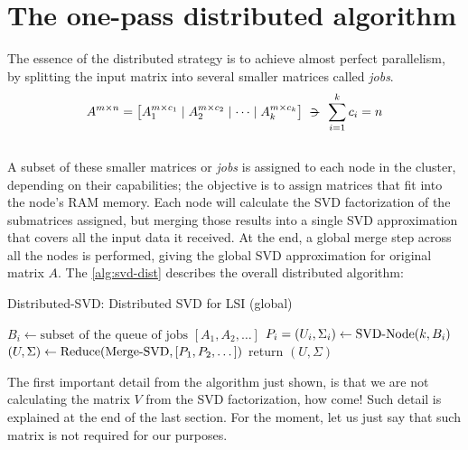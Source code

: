 \section{The one-pass distributed algorithm}

The essence of the distributed strategy is to achieve almost perfect
parallelism, by splitting the input matrix into several smaller
matrices called \emph{jobs}. \\

\[
A^{m \times n} = 
\begin{bmatrix}
A_1^{m \times c_1} \mid A_2^{m \times c_2} \mid \cdots \mid A_k^{m \times c_k}
\end{bmatrix}
\suchthat \sum_{i=1}^k c_i = n
\]
\\

A subset of these smaller matrices or \emph{jobs} is assigned to each
node in the cluster, depending on their capabilities; the
objective is to assign matrices that fit into the node's RAM
memory. Each node will calculate the SVD factorization of the
submatrices assigned, but merging those results into a single
SVD approximation that covers all the input data it received. At the
end, a global merge step across all the nodes is performed, giving the
global SVD approximation for original matrix $A$. The
\cref{alg:svd-dist} describes the overall distributed algorithm: \\

\begin{algorithm}
  \label{alg:svd-dist}
  \caption{Distributed-SVD: Distributed SVD for LSI (global)}
%
  \DontPrintSemicolon
%
%
%
    {
      $B_i \gets \text{subset of the queue of jobs } [A_1,A_2,\dots]$ \;
%
      $P_i = (U_i,\Sigma_i) \gets \operatorname{SVD-Node}(k,B_i)$ \;
    }
    $(U,\Sigma) \gets \operatorname{Reduce}(\operatorname{Merge-SVD},[P_1,P_2,\dots])$ \;
%
    return $(U, \Sigma)$ \;
\end{algorithm}
\hfill

The first important detail from the algorithm just shown, is that we
are not calculating the matrix $V$ from the SVD factorization, how
come! Such detail is explained at the end of the last section. For the
moment, let us just say that such matrix is not required for our
purposes. \\

